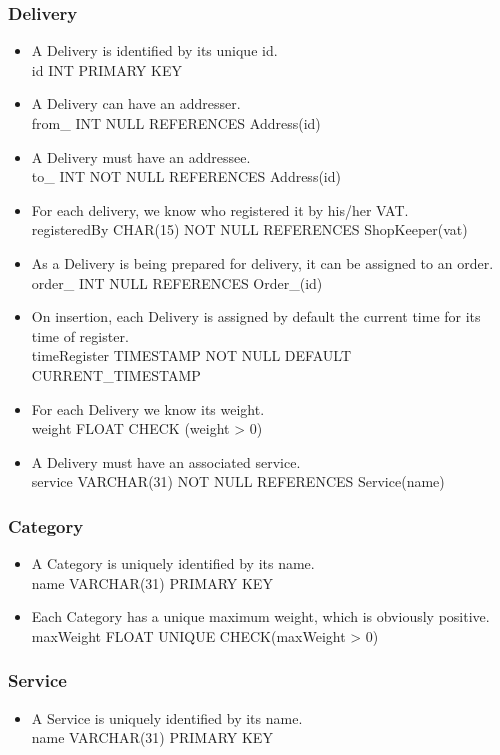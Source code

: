\documentclass{report}[a4paper]
\theoremstyle{remark}
\begin{document}
\subsubsection{Delivery}
\begin{itemize}
    \item A Delivery is identified by its unique id. \\id INT PRIMARY KEY
    \item A Delivery can have an addresser. \\ from\_ INT NULL REFERENCES Address(id)
    \item A Delivery must have an addressee. \\ to\_ INT NOT NULL REFERENCES Address(id)
    \item For each delivery, we know who registered it by his/her VAT. \\ registeredBy CHAR(15) NOT NULL REFERENCES ShopKeeper(vat)
    \item As a Delivery is being prepared for delivery, it can be assigned to an order. \\ order\_ INT NULL REFERENCES Order\_(id)
    \item On insertion, each Delivery is assigned by default the current time for its time of register. \\ timeRegister TIMESTAMP NOT NULL DEFAULT CURRENT\_TIMESTAMP
    \item For each Delivery we know its weight. \\ weight FLOAT CHECK (weight > 0)
    \item A Delivery must have an associated service. \\ service VARCHAR(31) NOT NULL REFERENCES Service(name)
\end{itemize}
\subsubsection{Category}
\begin{itemize}
    \item A Category is uniquely identified by its name. \\ name VARCHAR(31) PRIMARY KEY
    \item Each Category has a unique maximum weight, which is obviously positive. \\ maxWeight FLOAT UNIQUE CHECK(maxWeight > 0)
\end{itemize}
\subsubsection{Service}
\begin{itemize}
    \item A Service is uniquely identified by its name. \\ name VARCHAR(31) PRIMARY KEY
\end{itemize}
\end{document}
